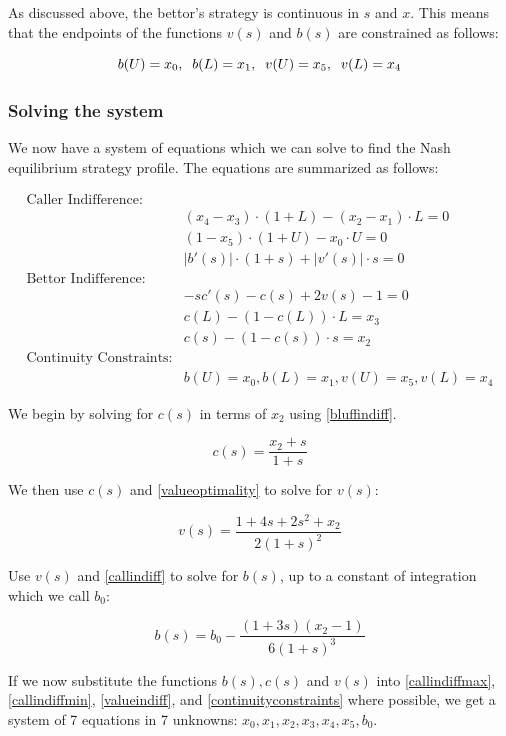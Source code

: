 \documentclass[a4paper,12pt]{article}
\theoremstyle{plain}
\theoremstyle{definition}
\begin{document}
As discussed above, the bettor's strategy is continuous in $s$ and $x$. This means that the endpoints of the functions $v(s)$ and $b(s)$ are constrained as follows:

\begin{equation}{\label{continuityconstraints}}
	 b(U) = x_0, \;\; b(L) = x_1, \;\; v(U) = x_5, \;\; v(L) = x_4
\end{equation}

\subsubsection{Solving the system}
We now have a system of equations which we can solve to find the Nash equilibrium strategy profile. The equations are summarized as follows:

\begin{align*}
    \text{Caller Indifference:} & \\
    & (x_4-x_3) \cdot (1+L) - (x_2-x_1) \cdot L = 0\\
    & (1-x_5) \cdot (1+U) - x_0 \cdot U = 0\\
    & |b'(s)| \cdot (1 + s) + |v'(s)| \cdot s = 0\\
    \text{Bettor Indifference:} & \\
    & -sc'(s) - c(s) + 2 v(s) - 1 = 0\\
    & c(L) - (1-c(L)) \cdot L = x_3\\
    & c(s) - (1-c(s)) \cdot s = x_2\\
    \text{Continuity Constraints:} & \\
    & b(U) = x_0, b(L) = x_1, v(U) = x_5, v(L) = x_4
\end{align*}

We begin by solving for $c(s)$ in terms of $x_2$ using \ref{bluffindiff}. 

\[ c(s) = \frac{x_2 + s}{1+s} \]

We then use $c(s)$ and \ref{valueoptimality} to solve for $v(s)$:

\[ v(s) = \frac{1+4s+2s^2+x_2}{2(1+s)^2} \]

Use $v(s)$ and \ref{callindiff} to solve for $b(s)$, up to a constant of integration which we call $b_0$:

\[ b(s) = b_0 - \frac{(1+3s)(x_2-1)}{6(1+s)^3} \]

If we now substitute the functions $b(s), c(s)$ and $v(s)$ into \ref{callindiffmax}, \ref{callindiffmin}, \ref{valueindiff}, and \ref{continuityconstraints} where possible, we get a system of 7 equations in 7 unknowns: $x_0, x_1, x_2, x_3, x_4, x_5, b_0$. 
\end{document}
